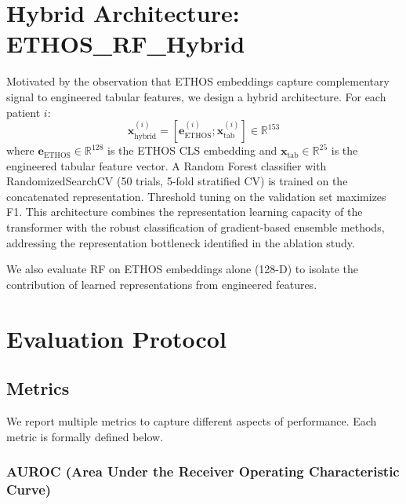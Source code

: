 \section{Hybrid Architecture: ETHOS\_RF\_Hybrid}
\label{sec:hybrid}

Motivated by the observation that ETHOS embeddings capture complementary signal to engineered tabular features, we design a hybrid architecture. For each patient $i$:
\begin{equation}
\mathbf{x}_{\text{hybrid}}^{(i)} = [\mathbf{e}_{\text{ETHOS}}^{(i)}; \mathbf{x}_{\text{tab}}^{(i)}] \in \mathbb{R}^{153}
\end{equation}
where $\mathbf{e}_{\text{ETHOS}} \in \mathbb{R}^{128}$ is the ETHOS CLS embedding and $\mathbf{x}_{\text{tab}} \in \mathbb{R}^{25}$ is the engineered tabular feature vector. A Random Forest classifier with RandomizedSearchCV (50 trials, 5-fold stratified CV) is trained on the concatenated representation. Threshold tuning on the validation set maximizes F1. This architecture combines the representation learning capacity of the transformer with the robust classification of gradient-based ensemble methods, addressing the representation bottleneck identified in the ablation study.

We also evaluate RF on ETHOS embeddings alone (128-D) to isolate the contribution of learned representations from engineered features.

\section{Evaluation Protocol}

\subsection{Metrics}

We report multiple metrics to capture different aspects of performance. Each metric is formally defined below.

\subsubsection{AUROC (Area Under the Receiver Operating Characteristic Curve)}


